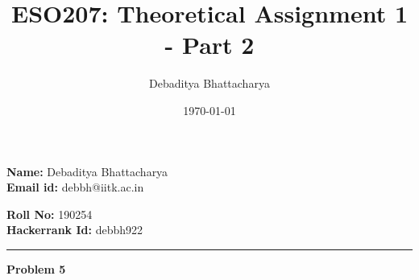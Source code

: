 \documentclass[10pt, a4paper]{article}
\title{ESO207: Theoretical Assignment 1 - Part 2}
\author{Debaditya Bhattacharya}
\date{\today}
\begin{document}
\maketitle

\noindent\begin{minipage}{2in}
    \textbf{Name: }Debaditya Bhattacharya \\
    \textbf{Email id: }debbh@iitk.ac.in  
\end{minipage}
\hfill
\noindent\begin{minipage}{1.9in}
    \textbf{Roll No: }190254\\
    \textbf{Hackerrank Id: }debbh922
\end{minipage}


\parskip 0.3cm
\parindent 0cm
\noindent\rule{\textwidth}{1px}
\noindent\large{\textbf{Problem 5}}
\normalsize
\vspace{5pt}
\end{document}
